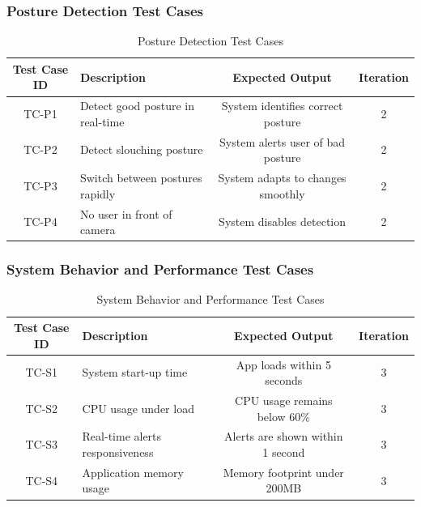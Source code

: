 \subsubsection{Posture Detection Test Cases}
\begin{table}[!htbp]
    \centering
    \begin{tabular}{|c|p{6cm}|c|c|}
        \hline
        \textbf{Test Case ID} & \textbf{Description} & \textbf{Expected Output} & \textbf{Iteration} \\
        \hline
        TC-P1 & Detect good posture in real-time & System identifies correct posture & 2 \\
        \hline
        TC-P2 & Detect slouching posture & System alerts user of bad posture & 2 \\
        \hline
        TC-P3 & Switch between postures rapidly & System adapts to changes smoothly & 2 \\
        \hline
        TC-P4 & No user in front of camera & System disables detection & 2 \\
        \hline
    \end{tabular}
    \caption{Posture Detection Test Cases}
    \label{tab:posture-test-cases}
\end{table}


\subsubsection{System Behavior and Performance Test Cases}
\begin{table}[!htbp]
    \centering
    \begin{tabular}{|c|p{6cm}|c|c|}
        \hline
        \textbf{Test Case ID} & \textbf{Description} & \textbf{Expected Output} & \textbf{Iteration} \\
        \hline
        TC-S1 & System start-up time & App loads within 5 seconds & 3 \\
        \hline
        TC-S2 & CPU usage under load & CPU usage remains below 60\% & 3 \\
        \hline
        TC-S3 & Real-time alerts responsiveness & Alerts are shown within 1 second & 3 \\
        \hline
        TC-S4 & Application memory usage & Memory footprint under 200MB & 3 \\
        \hline
    \end{tabular}
    \caption{System Behavior and Performance Test Cases}
    \label{tab:system-performance-test-cases}
\end{table}


